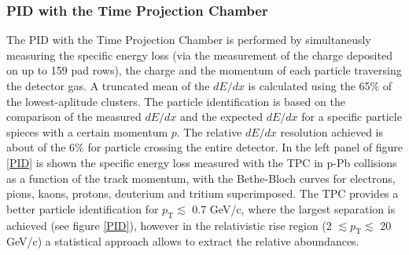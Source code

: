 \documentclass[b5paper,10pt,twoside,oldstyle,classica]{toptesi}
\newcommand{\pt}{p_\text{T}}
\begin{document}
\subsubsection{PID with the Time Projection Chamber}
The PID with the Time Projection Chamber is performed by simultaneusly measuring the specific energy loss (via the measurement of the charge deposited on up to 159 pad rows), the charge and the momentum of each particle traversing the detector gas. A truncated mean of the $dE/dx$ is calculated using the 65\% of the lowest-aplitude clusters. The particle identification is based on the comparison of the measured $dE/dx$ and the expected $dE/dx$ for a specific particle spieces with a certain momentum $p$. The relative $dE/dx$ resolution achieved is about of the 6\% for particle crossing the entire detector. In the left panel of figure \ref{PID} is shown the specific energy loss measured with the TPC in p-Pb collisions as a function of the track momentum, with the Bethe-Bloch curves for electrons, pions, kaons, protons, deuterium and tritium superimposed.
The TPC provides a better particle identification for $\pt \lesssim$ 0.7 GeV/c, where the largest separation is achieved (see figure \ref{PID}), however in the relativistic rise region (2 $\lesssim \pt \lesssim$ 20 GeV/c) a statistical approach allows to extract the relative aboundances.  
\end{document}
